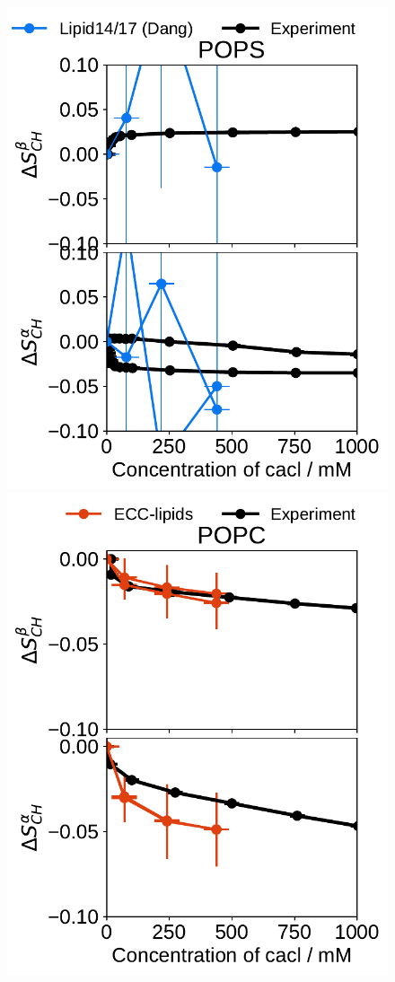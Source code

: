 \begin{figure}[htb!]
  \includegraphics[width=\figwidth]{../img/ecc_pops/l17/order_parameters_changes_A-B_POPS_cacl.pdf} 
  \includegraphics[width=\figwidth]{../img/ecc_pops/order_parameters_changes_A-B_POPC_cacl.pdf} 

\end{figure}
